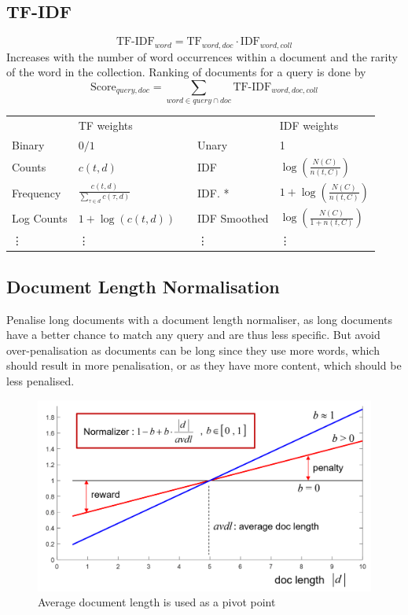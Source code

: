 \documentclass[11pt]{article}
\begin{document}
\subsection{TF-IDF}
\begin{equation*}
	\text{TF-IDF}_{word} = \text{TF}_{word,doc}\cdot\text{IDF}_{word,coll}
\end{equation*}
Increases with the number of word occurrences within a document and the rarity of the word in the collection. Ranking of documents for a query is done by
\begin{equation*}
	\text{Score}_{query,doc} = \underset{word\in query\cap doc}{\sum} \text{TF-IDF}_{word,doc,coll}
\end{equation*}
\begin{minipage}{\textwidth}
	\renewcommand{\arraystretch}{1.5}
	\begin{tabularx}{\linewidth}{|l|X|p{2cm}|l|X|}
		\cline{1-2}\cline{4-5}
		& TF weights & & & IDF weights\\
		\cline{1-2}\cline{4-5}
		Binary & $ 0 / 1$& & Unary & 1\\
		\cline{1-2}\cline{4-5}
		Counts & $c(t,d)$ & & IDF & $\log\left(\frac{N(C)}{n(t,C)}\right)$\\
		\cline{1-2}\cline{4-5}
		Frequency & $\frac{c(t,d)}{\sum_{\tau\in d} c(\tau,d)}$ & & IDF.
		* & $ 1 + \log\left(\frac{N(C)}{n(t,C)}\right) $ \\
		\cline{1-2}\cline{4-5}
		Log Counts & $ 1 + \log\left( c(t,d) \right) $ & & IDF Smoothed & $\log\left(\frac{N(C)}{1 + n(t,C)}\right)$\\
		\cline{1-2}\cline{4-5}
		\vdots & \vdots & & \vdots & \vdots\\
		\cline{1-2}\cline{4-5}
	\end{tabularx}
\end{minipage}

\subsection{Document Length Normalisation}
Penalise long documents with a document length normaliser, as long documents have a better chance to match any query and are thus less specific. But avoid over-penalisation as documents can be long since they use more words, which should result in more penalisation, or as they have more content, which should be less penalised.
\begin{figure}[H]
	\centering
	\includegraphics[width=0.6\linewidth]{img/pivot_length_normaliser}
	\caption{Average document length is used as a pivot point}
	\label{fig:pivotlengthnormaliser}
\end{figure}
\end{document}
